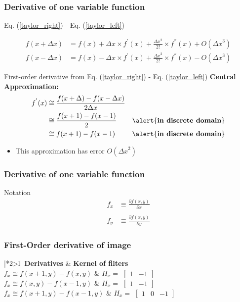 \documentclass[english,11pt,table,handout]{beamer}
\begin{document}
\frame
{
	\frametitle{Derivative of one variable function}
	Eq. (\ref{taylor_right}) - Eq. (\ref{taylor_left}) 
	
	\begin{align}
	\nonumber
	f(x + \Delta x) &= f(x) + \Delta x \times f^{'}(x) +\frac{{\Delta x}^2}{2!} \times f^{''}(x) + O({\Delta x}^3) \\
	\nonumber
	f(x - \Delta x) &= f(x) - \Delta x \times f^{'}(x) +\frac{{\Delta x}^2}{2!} \times f^{''}(x) - O({\Delta x}^3) 
	\end{align}
	
	
	\begin{block}{First-order derivative from Eq. (\ref{taylor_right}) - Eq. (\ref{taylor_left}) }
		\alert{\textbf{Central Approximation:}} 
		\begin{align}
		\nonumber
		f^{'}(x) &\cong \frac{f(x+ \Delta) - f(x- \Delta x)}{2\Delta x} &&\\
		\nonumber
		&\cong \frac{f(x+1) - f(x-1)}{2} &\text{\alert{\textbf{in discrete domain}}} \\
		\nonumber
		&\cong f(x+1) - f(x-1) &\text{\alert{\textbf{in discrete domain}}}
		\end{align}
		\begin{itemize}
			\item This approximation has error $O({\Delta x}^2)$ 
		\end{itemize}
	\end{block}
	
}
\frame
{
	\frametitle{Derivative of one variable function}
	
	\begin{alertblock}{Notation}
			\begin{align}
				\nonumber
				f_x &\equiv \frac{\partial f(x,y)}{\partial x}\\
				\nonumber
				& \\
				\nonumber
				f_y &\equiv \frac{\partial f(x,y)}{\partial y}
			\end{align}
	\end{alertblock}
	
}
\frame
{
	\frametitle{First-Order derivative of image}
	\renewcommand{\arraystretch}{3}
	
	\begin{tabular}{|*2{>{\renewcommand{\arraystretch}{1}}l|}}
		\hline
		\textbf{Derivatives} & \textbf{Kernel of filters}\\
		\hline
		$f_x \cong f(x+1, y) - f(x,y)$ & 
		$H_{x} = $ $\left[ \begin{array}{cc} 1 & -1 \end{array}\right]$\\
		\hline
		$f_x \cong f(x, y) - f(x-1,y)$ & 
		$H_{x} = $ $ \left[ \begin{array}{cc} 1 & -1 \end{array}\right]$\\
		\hline
		$f_x \cong f(x+1, y) - f(x-1,y)$ & 
		$H_{x} =$ $ \left[ \begin{array}{ccc} 1 & 0 & -1 \end{array}\right]$\\
		\hline
	\end{tabular}
}
\end{document}
